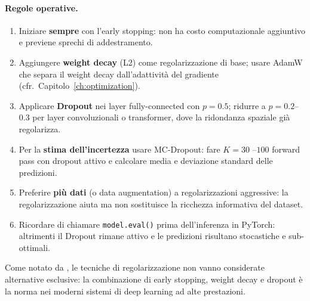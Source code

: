 \paragraph{Regole operative.}
\begin{enumerate}
  \item Iniziare \textbf{sempre} con l'early stopping: non ha costo
        computazionale aggiuntivo e previene sprechi di addestramento.
  \item Aggiungere \textbf{weight decay} (L2) come regolarizzazione di base;
        usare AdamW che separa il weight decay dall'adattività del gradiente
        (cfr.\ Capitolo~\ref{ch:optimization}).
  \item Applicare \textbf{Dropout} nei layer fully-connected con $p = 0.5$;
        ridurre a $p = 0.2$--$0.3$ per layer convoluzionali o transformer,
        dove la ridondanza spaziale già regolarizza.
  \item Per la \textbf{stima dell'incertezza} usare MC-Dropout: fare $K = 30$
        --$100$ forward pass con dropout attivo e calcolare media e deviazione
        standard delle predizioni.
  \item Preferire \textbf{più dati} (o data augmentation) a regolarizzazioni
        aggressive: la regolarizzazione aiuta ma non sostituisce la ricchezza
        informativa del dataset.
  \item Ricordare di chiamare \texttt{model.eval()} prima dell'inferenza
        in PyTorch: altrimenti il Dropout rimane attivo e le predizioni
        risultano stocastiche e sub-ottimali.
\end{enumerate}

Come notato da \citet{bishop2024}, le tecniche di regolarizzazione non vanno
considerate alternative esclusive: la combinazione di early stopping, weight
decay e dropout è la norma nei moderni sistemi di deep learning ad alte
prestazioni.

